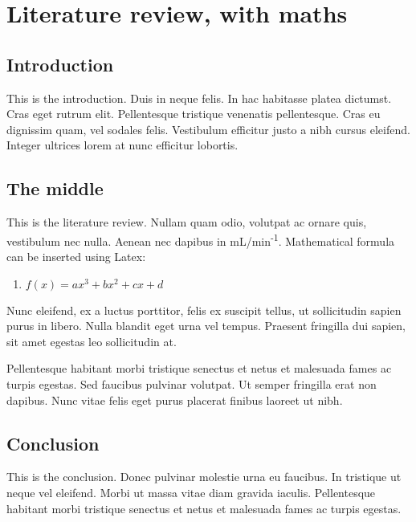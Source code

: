 \documentclass[11pt,letterpaper,]{article}
\providecommand{\tightlist}{%
  \setlength{\itemsep}{0pt}\setlength{\parskip}{0pt}}
\begin{document}
\section{Literature review, with
maths}\label{literature-review-with-maths}

\subsection{Introduction}\label{introduction}

This is the introduction. Duis in neque felis. In hac habitasse platea
dictumst. Cras eget rutrum elit. Pellentesque tristique venenatis
pellentesque. Cras eu dignissim quam, vel sodales felis. Vestibulum
efficitur justo a nibh cursus eleifend. Integer ultrices lorem at nunc
efficitur lobortis.

\subsection{The middle}\label{the-middle}

This is the literature review. Nullam quam odio, volutpat ac ornare
quis, vestibulum nec nulla. Aenean nec dapibus in
mL/min\textsuperscript{-1}. Mathematical formula can be inserted using
Latex:

\begin{enumerate}
\def\labelenumi{(\arabic{enumi})}
\tightlist
\item
  \(f(x) = ax^3 + bx^2 + cx + d\)
\end{enumerate}

Nunc eleifend, ex a luctus porttitor, felis ex suscipit tellus, ut
sollicitudin sapien purus in libero. Nulla blandit eget urna vel tempus.
Praesent fringilla dui sapien, sit amet egestas leo sollicitudin at.

Pellentesque habitant morbi tristique senectus et netus et malesuada
fames ac turpis egestas. Sed faucibus pulvinar volutpat. Ut semper
fringilla erat non dapibus. Nunc vitae felis eget purus placerat finibus
laoreet ut nibh.

\subsection{Conclusion}\label{conclusion}

This is the conclusion. Donec pulvinar molestie urna eu faucibus. In
tristique ut neque vel eleifend. Morbi ut massa vitae diam gravida
iaculis. Pellentesque habitant morbi tristique senectus et netus et
malesuada fames ac turpis egestas.
\end{document}

